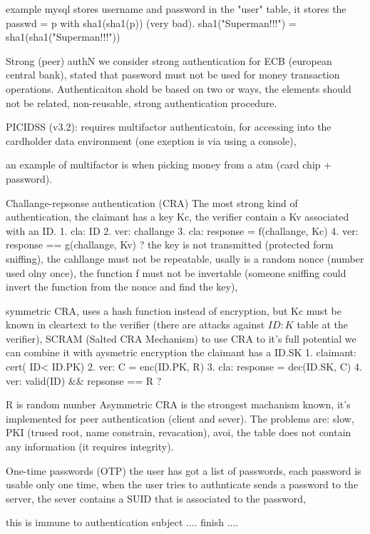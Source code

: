 \documentclass[12pt]{article}
\begin{document}
example mysql
stores username and password in the "user" table, it stores the passwd = p with sha1(sha1(p)) (very bad). sha1("Superman!!!") = sha1(sha1("Superman!!!")) 


Strong (peer) authN
we consider strong authentication for ECB (european central bank), stated that password must not be used for money transaction operations. Authenticaiton shold be based on two or ways, the elements should not be related, non-reusable, strong authentication procedure.

PICIDSS (v3.2): requires multifactor authenticatoin, for accessing into the cardholder data environment (one exeption is via using a console),

an example of multifactor is when picking money from a atm (card chip + password).



Challange-repsonse authentication (CRA)
The most strong kind of authentication, the claimant has a key Kc, the verifier contain a Kv associated with an ID.
1. cla: ID
2. ver: challange
3. cla: response = f(challange, Kc)
4. ver: response == g(challange, Kv) ?
the key is not transmitted (protected form sniffing), the cahllange must not be repeatable, usally is a random nonce (number used olny once), the function f must not be invertable (someone sniffing could invert the function from the nonce and find the key), 

symmetric CRA, uses a hash function instead of encryption, but Kc must be known in cleartext to the verifier (there are attacks against ${ ID: K }$ table at the verifier), SCRAM (Salted CRA Mechanism)
to use CRA to it's full potential we can combine it with aysmetric encryption
the claimant has a ID.SK
1. claimant: cert( ID< ID.PK)
2. ver: C = enc(ID.PK, R)
3. cla: response  = dec(ID.SK, C)
4. ver: valid(ID) \&\& repsonse == R ?

R is random number
Asymmetric CRA is the strongest machanism known, it's implemented for peer authentication (client and sever). The problems are: slow, PKI (trused root, name constrain, revacation), avoi, the table does not contain any information (it requires integrity).



One-time passwords (OTP)
the user has got a list of passwords, each password is usable only one time, when the user tries to authnticate sends a password to the server, the sever contains a SUID that is associated to the password,

this is immune to authentication
subject .... finish ....
\end{document}
